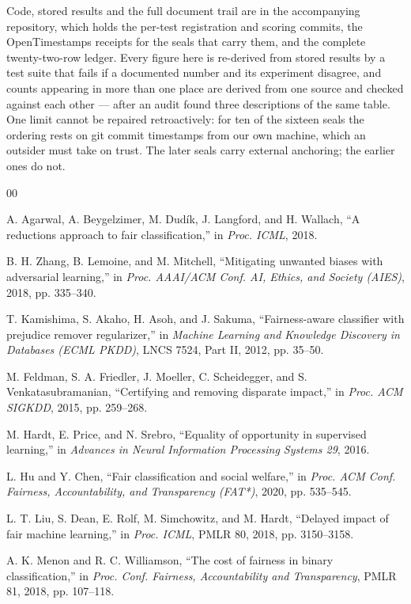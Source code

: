 \documentclass[conference]{IEEEtran}
\begin{document}
Code, stored results and the full document trail are in the accompanying repository, which
holds the per-test registration and scoring commits, the OpenTimestamps receipts for the seals
that carry them, and the complete twenty-two-row ledger. Every figure here is re-derived from
stored results by a test suite that fails if a documented number and its experiment disagree,
and counts appearing in more than one place are derived from one source and checked against
each other --- after an audit found three descriptions of the same table. One limit cannot be
repaired retroactively: for ten of the sixteen seals the ordering rests on git commit
timestamps from our own machine, which an outsider must take on trust. The later seals carry
external anchoring; the earlier ones do not.

\begin{thebibliography}{00}

 A. Agarwal, A. Beygelzimer, M. Dud\'{i}k, J. Langford, and H. Wallach,
``A reductions approach to fair classification,'' in \emph{Proc. ICML}, 2018.

 B. H. Zhang, B. Lemoine, and M. Mitchell, ``Mitigating unwanted biases
with adversarial learning,'' in \emph{Proc. AAAI/ACM Conf. AI, Ethics, and Society (AIES)},
2018, pp. 335--340.

 T. Kamishima, S. Akaho, H. Asoh, and J. Sakuma, ``Fairness-aware
classifier with prejudice remover regularizer,'' in \emph{Machine Learning and Knowledge
Discovery in Databases (ECML PKDD)}, LNCS 7524, Part II, 2012, pp. 35--50.

 M. Feldman, S. A. Friedler, J. Moeller, C. Scheidegger, and
S. Venkatasubramanian, ``Certifying and removing disparate impact,'' in \emph{Proc. ACM
SIGKDD}, 2015, pp. 259--268.

 M. Hardt, E. Price, and N. Srebro, ``Equality of opportunity in
supervised learning,'' in \emph{Advances in Neural Information Processing Systems 29}, 2016.

 L. Hu and Y. Chen, ``Fair classification and social welfare,'' in
\emph{Proc. ACM Conf. Fairness, Accountability, and Transparency (FAT*)}, 2020,
pp. 535--545.

 L. T. Liu, S. Dean, E. Rolf, M. Simchowitz, and M. Hardt, ``Delayed impact
of fair machine learning,'' in \emph{Proc. ICML}, PMLR 80, 2018, pp. 3150--3158.

 A. K. Menon and R. C. Williamson, ``The cost of fairness in binary
classification,'' in \emph{Proc. Conf. Fairness, Accountability and Transparency}, PMLR 81,
2018, pp. 107--118.


\end{thebibliography}
\end{document}
